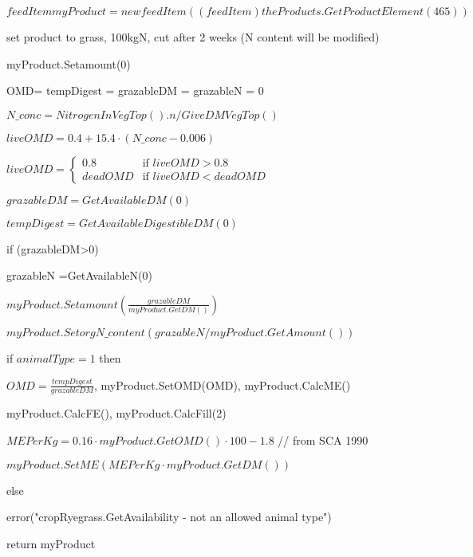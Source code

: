 \documentclass[%
]{scrartcl}
\begin{document}
$feedItem myProduct = new feedItem((feedItem)theProducts.GetProductElement(465))  $

set product to grass, 100kgN, cut after 2 weeks (N content will be modified)

myProduct.Setamount(0)

   OMD=
   tempDigest = 
   grazableDM =
   grazableN = 0

   $N\_conc = NitrogenInVegTop().n/GiveDMVegTop()$

   $liveOMD = 0.4 + 15.4  \cdot  (N\_conc-0.006)$

   $liveOMD = \begin{cases}
              0.8 & \text{if $liveOMD>0.8$} \\
              deadOMD  & \text {if $liveOMD<deadOMD$}
             \end{cases}$


   $grazableDM=GetAvailableDM(0)$

   $tempDigest= GetAvailableDigestibleDM(0)$

   if (grazableDM>0)
   	
       \quad    grazableN =GetAvailableN(0)

       \quad    $myProduct.Setamount(\tfrac{grazableDM}{myProduct.GetDM()})$

        \quad   $myProduct.SetorgN\_content(grazableN/myProduct.GetAmount())$

  
        
         \quad     if $animalType=1$ then
           
         \quad   \quad     $ OMD=\tfrac{tempDigest}{grazableDM}$,
               myProduct.SetOMD(OMD),
           myProduct.CalcME()

         \quad    \quad     myProduct.CalcFE(),
          myProduct.CalcFill(2)

        \quad       \quad   $MEPerKg = 0.16 \cdot myProduct.GetOMD() \cdot 100 - 1.8$  //  from SCA 1990

        \quad    \quad      $myProduct.SetME(MEPerKg  \cdot  myProduct.GetDM())$

       \quad         
       \quad      

       \quad       else 

 \quad    \quad    error("cropRyegrass.GetAvailability - not an allowed animal type")

      \quad           
       

	return myProduct
\end{document}
